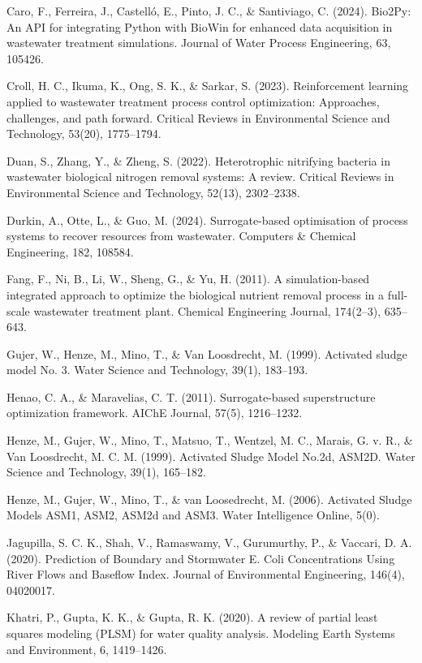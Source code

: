 \documentclass{article}
\begin{document}
Caro, F., Ferreira, J., Castelló, E., Pinto, J. C., \& Santiviago, C. (2024). Bio2Py: An API for integrating Python with BioWin for enhanced data acquisition in wastewater treatment simulations. Journal of Water Process Engineering, 63, 105426.

Croll, H. C., Ikuma, K., Ong, S. K., \& Sarkar, S. (2023). Reinforcement learning applied to wastewater treatment process control optimization: Approaches, challenges, and path forward. Critical Reviews in Environmental Science and Technology, 53(20), 1775–1794.

Duan, S., Zhang, Y., \& Zheng, S. (2022). Heterotrophic nitrifying bacteria in wastewater biological nitrogen removal systems: A review. Critical Reviews in Environmental Science and Technology, 52(13), 2302–2338.

Durkin, A., Otte, L., \& Guo, M. (2024). Surrogate-based optimisation of process systems to recover resources from wastewater. Computers \& Chemical Engineering, 182, 108584.

Fang, F., Ni, B., Li, W., Sheng, G., \& Yu, H. (2011). A simulation-based integrated approach to optimize the biological nutrient removal process in a full-scale wastewater treatment plant. Chemical Engineering Journal, 174(2–3), 635–643.

Gujer, W., Henze, M., Mino, T., \& Van Loosdrecht, M. (1999). Activated sludge model No. 3. Water Science and Technology, 39(1), 183–193.

Henao, C. A., \& Maravelias, C. T. (2011). Surrogate-based superstructure optimization framework. AIChE Journal, 57(5), 1216–1232.

Henze, M., Gujer, W., Mino, T., Matsuo, T., Wentzel, M. C., Marais, G. v. R., \& Van Loosdrecht, M. C. M. (1999). Activated Sludge Model No.2d, ASM2D. Water Science and Technology, 39(1), 165–182.

Henze, M., Gujer, W., Mino, T., \& van Loosedrecht, M. (2006). Activated Sludge Models ASM1, ASM2, ASM2d and ASM3. Water Intelligence Online, 5(0).

Jagupilla, S. C. K., Shah, V., Ramaswamy, V., Gurumurthy, P., \& Vaccari, D. A. (2020). Prediction of Boundary and Stormwater E. Coli Concentrations Using River Flows and Baseflow Index. Journal of Environmental Engineering, 146(4), 04020017.

Khatri, P., Gupta, K. K., \& Gupta, R. K. (2020). A review of partial least squares modeling (PLSM) for water quality analysis. Modeling Earth Systems and Environment, 6, 1419–1426.
\end{document}
